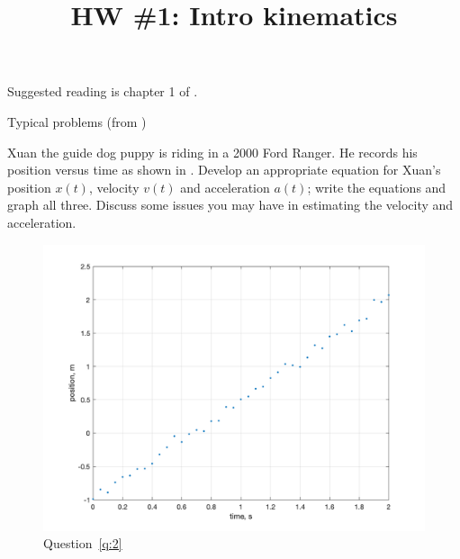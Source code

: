 \documentclass [hw]{exam}
\title{HW \#1: Intro kinematics}
\author{\mobeardInstructorShort}
\date{\printdate{6/15/2021}}
\begin{document}
\maketitle

Suggested reading is chapter 1 of \citet{kleppner2014introduction}.

\begin{questions}
\question Typical problems (from \citet{hecht2018schaums})

\question\label{q:2} Xuan the guide dog puppy is riding in a 2000 Ford Ranger. He records his position versus time as shown in . Develop an appropriate equation for Xuan's position $x(t)$, velocity $v(t)$ and acceleration $a(t)$; write the equations and graph all three. Discuss some issues you may have in estimating the velocity and acceleration. 
\begin{figure}[h]
\begin{center}
\includegraphics[width=0.75\columnwidth]{hw1p2.png}
\end{center}
\caption{Question~\ref{q:2}}
\label{fig:q2}
\end{figure}


\end{questions}
\end{document}
